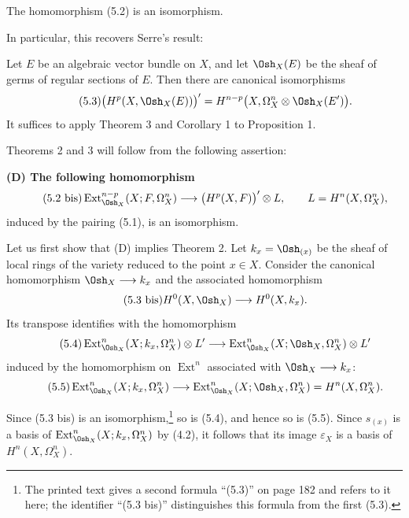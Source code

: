  The homomorphism (5.2) is an isomorphism.

In particular, this recovers Serre's result:

 Let $E$ be an algebraic vector bundle on $X$, and let
$\Osh_X(E)$ be the sheaf of germs of regular sections of $E$. Then there are
canonical isomorphisms
\begin{equation}\tag{5.3}
  \bigl(H^{p}(X,\Osh_X(E))\bigr)'
  =H^{n-p}\bigl(X,\Omega_X^{n}\otimes\Osh_X(E')\bigr).
\end{equation}
It suffices to apply Theorem 3 and Corollary 1 to Proposition 1.

Theorems 2 and 3 will follow from the following assertion:

\noindent\textbf{(D) The following homomorphism}
\begin{equation}\tag{5.2 bis}
  \operatorname{Ext}_{\Osh_X}^{n-p}(X;F,\Omega_X^{n})
  \longrightarrow\bigl(H^{p}(X,F)\bigr)'\otimes L,
  \qquad L=H^{n}(X,\Omega_X^{n}),
\end{equation}
induced by the pairing (5.1), is an isomorphism.

Let us first show that (D) implies Theorem 2. Let $k_x=\Osh_{(x)}$ be the sheaf
of local rings of the variety reduced to the point $x\in X$. Consider the
canonical homomorphism $\Osh_X\longrightarrow k_x$ and the associated
homomorphism
\begin{equation}\tag{5.3 bis}
  H^{0}(X,\Osh_X)\longrightarrow H^{0}(X,k_x).
\end{equation}
Its transpose identifies with the homomorphism
\begin{equation}\tag{5.4}
  \operatorname{Ext}_{\Osh_X}^{n}(X;k_x,\Omega_X^{n})\otimes L'
  \longrightarrow
  \operatorname{Ext}_{\Osh_X}^{n}(X;\Osh_X,\Omega_X^{n})\otimes L'
\end{equation}
induced by the homomorphism on $\operatorname{Ext}^{n}$ associated with
$\Osh_X\longrightarrow k_x$:
\begin{equation}\tag{5.5}
  \operatorname{Ext}_{\Osh_X}^{n}(X;k_x,\Omega_X^{n})
  \longrightarrow
  \operatorname{Ext}_{\Osh_X}^{n}(X;\Osh_X,\Omega_X^{n})
  =H^{n}(X,\Omega_X^{n}).
\end{equation}

Since (5.3 bis) is an isomorphism,\footnote{The printed text gives a second
formula ``(5.3)'' on page 182 and refers to it here; the identifier
``(5.3 bis)'' distinguishes this formula from the first (5.3).} so is (5.4),
and hence so is (5.5). Since $s_{(x)}$ is a basis of
$\operatorname{Ext}_{\Osh_X}^{n}(X;k_x,\Omega_X^{n})$ by (4.2), it follows that
its image $\varepsilon_X$ is a basis of $H^{n}(X,\Omega_X^{n})$.

